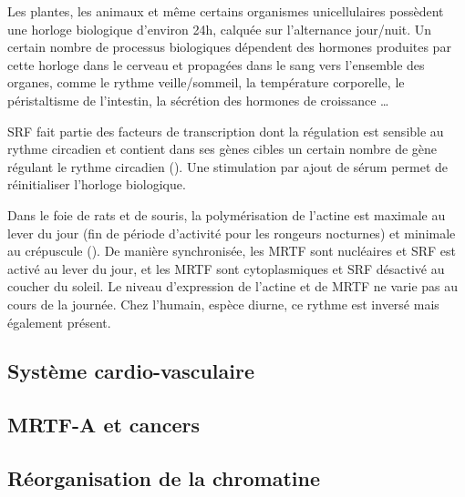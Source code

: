 \documentclass{report}
\begin{document}
Les plantes, les animaux et même certains organismes unicellulaires possèdent une horloge biologique d'environ 24h, calquée sur l'alternance jour/nuit. Un certain nombre de processus biologiques dépendent des hormones produites par cette horloge dans le cerveau et propagées dans le sang vers l'ensemble des organes, comme le rythme veille/sommeil, la température corporelle, le péristaltisme de l'intestin, la sécrétion des hormones de croissance \dots 

SRF fait partie des facteurs de transcription dont la régulation est sensible au rythme circadien et contient dans ses gènes cibles un certain nombre de gène régulant le rythme circadien (\cite{esnault_rho-actin_2014}). Une stimulation par ajout de sérum permet de réinitialiser l'horloge biologique.

Dans le foie de rats et de souris, la polymérisation de l'actine est maximale au lever du jour (fin de période d'activité pour les rongeurs nocturnes) et minimale au crépuscule (\cite{gerber_blood-borne_2013}). De manière synchronisée, les MRTF sont nucléaires et SRF est activé au lever du jour, et les MRTF sont cytoplasmiques et SRF désactivé au coucher du soleil. Le niveau d'expression de l'actine et de MRTF ne varie pas au cours de la journée. Chez l'humain, espèce diurne, ce rythme est inversé mais également présent. 



\subsection{Système cardio-vasculaire}



\subsection{MRTF-A et cancers}


\subsection{Réorganisation de la chromatine}


\newpage

\printbibliography
\end{document}
